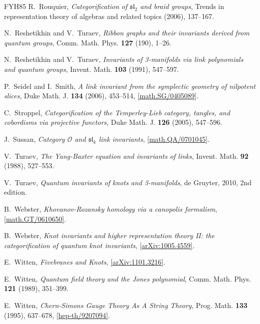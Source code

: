 \documentclass{compositio}
\theoremstyle{definition}
\numberwithin{equation}{section}
\begin{document}
\begin{thebibliography}{FYH{\etalchar{+}}85}
R.~Rouquier, \emph{Categorification of {$\mathfrak{sl}_{2}$} and braid groups},
  Trends in representation theory of algebras and related topics (2006),
  137--167.

N.~Reshetikhin and V.~Turaev, \emph{Ribbon graphs and their invariants derived
  from quantum groups}, Comm. Math. Phys. \textbf{127} (190), 1--26.

N.~Reshetikhin and V.~Turaev, \emph{Invariants of 3-manifolds via link polynomials and quantum
  groups}, Invent. Math. \textbf{103} (1991), 547--597.

P.~Seidel and I.~Smith, \emph{A link invariant from the symplectic geometry of
  nilpotent slices}, Duke Math. J. \textbf{134} (2006), 453--514,
  \href{http://arxiv.org/abs/math/0405089}{[math.SG/0405089]}.

C.~Stroppel, \emph{Categorification of the {T}emperley-{L}ieb category,
  tangles, and cobordisms via projective functors}, Duke Math. J. \textbf{126}
  (2005), 547--596.

J.~Sussan, \emph{Category {$\mathcal O$} and {$\mathfrak{sl}_k$} link
  invariants}, \href{http://arxiv.org/abs/math/0701045}{[math.QA/0701045]}.

V.~Turaev, \emph{The {Y}ang-{B}axter equation and invariants of links}, Invent.
  Math. \textbf{92} (1988), 527--553.

V.~Turaev, \emph{Quantum invariants of knots and 3-manifolds}, de Gruyter, 2010,
  2nd edition.

B.~Webster, \emph{Khovanov-Rozansky homology via a canopolis formalism},
  \href{http://arxiv.org/abs/math/0610650}{[math.GT/0610650]}.

B.~Webster, \emph{Knot invariants and higher representation theory {II}: the
  categorification of quantum knot invariants},
  \href{http://arxiv.org/abs/1005.4559}{[arXiv:1005.4559]}.

E.~Witten, \emph{Fivebranes and {K}nots},
  \href{http://arxiv.org/abs/1101.3216}{[arXiv:1101.3216]}.

E.~Witten, \emph{Quantum field theory and the {J}ones polynomial}, Comm. Math.
  Phys. \textbf{121} (1989), 351--399.

E.~Witten, \emph{Chern-{S}imons {G}auge {T}heory {A}s {A} {S}tring {T}heory},
  Prog. Math. \textbf{133} (1995), 637--678,
  \href{http://arxiv.org/abs/hep-th/9207094}{[hep-th/9207094]}.


\end{thebibliography}
\end{document}
